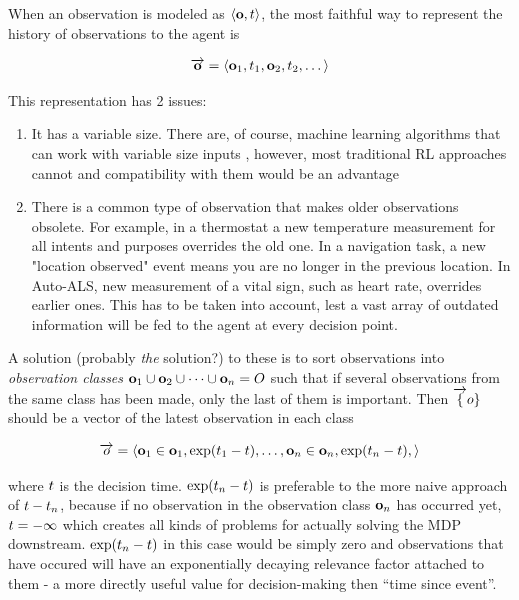 When an observation is modeled as $\langle \mathbf{o}, t \rangle$, the most faithful way to represent the history of observations to the agent is

\begin{equation} 
\overrightarrow{\mathbf{o}} = \langle \mathbf{o}_1, t_1, \mathbf{o}_2, t_2, \dots \rangle 
\end{equation}

This representation has 2 issues: 
\begin{enumerate}
    \item It has a variable size. There are, of course, machine learning algorithms that can work with variable size inputs \cite{hochreiterLongShorttermMemory1997}, however, most traditional RL approaches cannot and compatibility with them would be an advantage
    \item There is a common type of observation that makes older observations obsolete. For example, in a thermostat a new temperature measurement for all intents and purposes overrides the old one. In a navigation task, a new "location observed" event means you are no longer in the previous location. In Auto-ALS, new measurement of a vital sign, such as heart rate, overrides earlier ones. This has to be taken into account, lest a vast array of outdated information will be fed to the agent at every decision point.
\end{enumerate}

A solution (probably \emph{the} solution?) to these is to sort observations into \emph{observation classes} $\mathbf{o}_1 \cup \mathbf{o}_2 \cup \dots \cup \mathbf{o}_n = O$ such that if several observations from the same class has been made, only the last of them is important. Then $\overrightarrow\{o\}$ should be a vector of the latest observation in each class

\begin{equation} 
  \overrightarrow{o} = \langle \mathbf{o}_1 \in \mathbf{o}_1, \exp(t_1-t), \dots, \mathbf{o}_n \in \mathbf{o}_n, \exp(t_n-t), \rangle
\end{equation}

where $t$ is the decision time. 
$\exp(t_n-t)$ is preferable to the more naive approach of $t-t_n$, because if no observation in the observation class $\mathbf{o}_n$ has occurred yet, $t=-\infty$ which creates all kinds of problems for actually solving the MDP downstream. 
$\exp(t_n-t)$ in this case would be simply zero and observations that have occured will have an exponentially decaying relevance factor attached to them - a more directly useful value for decision-making then ``time since event''.

